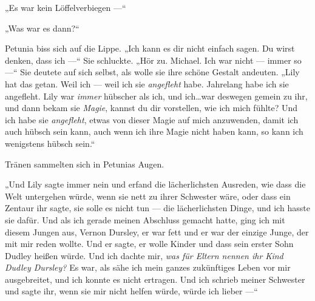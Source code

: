 „Es war kein Löffelverbiegen —“

„Was war es dann?“

Petunia biss sich auf die Lippe. „Ich kann es dir nicht einfach sagen. Du wirst denken, dass ich —“ Sie schluckte. „Hör zu. Michael. Ich war nicht — immer so —“ Sie deutete auf sich selbst, als wolle sie ihre schöne Gestalt andeuten. „Lily hat das getan. Weil ich — weil ich sie \emph{angefleht} habe. Jahrelang habe ich sie angefleht. Lily war \emph{immer} hübscher als ich, und ich…war deswegen gemein zu ihr, und dann bekam sie \emph{Magie}, kannst du dir vorstellen, wie ich mich fühlte? Und ich habe sie \emph{angefleht}, etwas von dieser Magie auf mich anzuwenden, damit ich auch hübsch sein kann, auch wenn ich ihre Magie nicht haben kann, so kann ich wenigstens hübsch sein.“

Tränen sammelten sich in Petunias Augen.

„Und Lily sagte immer nein und erfand die lächerlichsten Ausreden, wie dass die Welt untergehen würde, wenn sie nett zu ihrer Schwester wäre, oder dass ein Zentaur ihr sagte, sie solle es nicht tun — die lächerlichsten Dinge, und ich hasste sie dafür. Und als ich gerade meinen Abschluss gemacht hatte, ging ich mit diesem Jungen aus, Vernon Dursley, er war fett und er war der einzige Junge, der mit mir reden wollte. Und er sagte, er wolle Kinder und dass sein erster Sohn Dudley heißen würde. Und ich dachte mir, \emph{was für Eltern nennen ihr Kind Dudley Dursley?} Es war, als sähe ich mein ganzes zukünftiges Leben vor mir ausgebreitet, und ich konnte es nicht ertragen. Und ich schrieb meiner Schwester und sagte ihr, wenn sie mir nicht helfen würde, würde ich lieber —“

